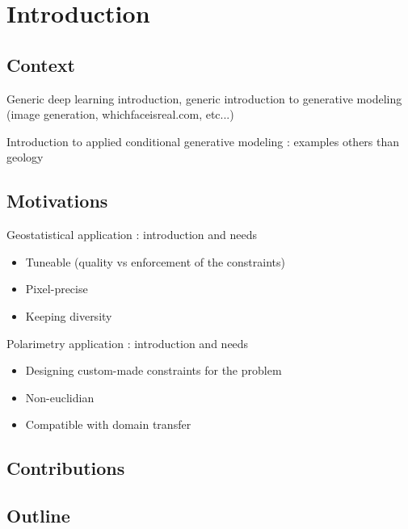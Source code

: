 \chapter*{Introduction}
\label{chap:intro}

\section*{Context}
Generic deep learning introduction, generic introduction to generative modeling (image generation, whichfaceisreal.com, etc...)

Introduction to applied conditional generative modeling : examples others than geology

\section*{Motivations}
Geostatistical application :  introduction and needs \begin{itemize}
	\item Tuneable (quality vs enforcement of the constraints)
	\item Pixel-precise
	\item Keeping diversity
\end{itemize}

Polarimetry application : introduction and needs \begin{itemize}
	\item Designing custom-made constraints for the problem
	\item Non-euclidian
	\item Compatible with domain transfer
\end{itemize}

\section*{Contributions}

\section*{Outline}
